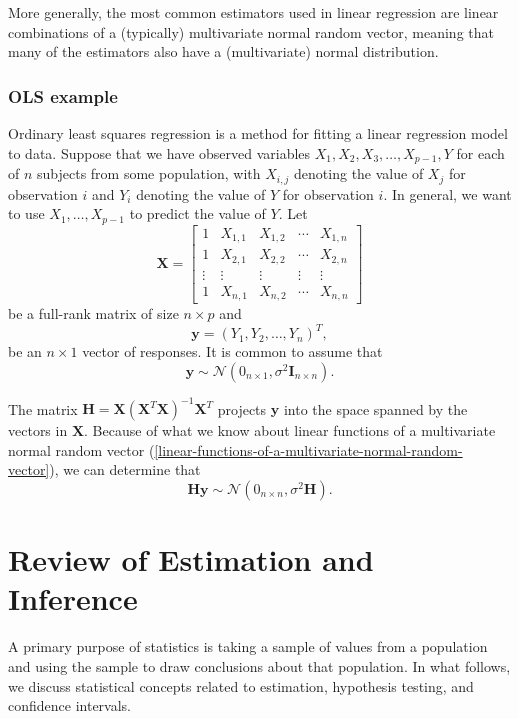 \documentclass[
]{book}
\theoremstyle{definition}
\theoremstyle{definition}
\theoremstyle{definition}
\theoremstyle{definition}
\theoremstyle{remark}
\begin{document}
More generally, the most common estimators used in linear regression are linear combinations of a (typically) multivariate normal random vector, meaning that many of the estimators also have a (multivariate) normal distribution.

\hypertarget{ols-example}{%
\subsection{OLS example}\label{ols-example}}

Ordinary least squares regression is a method for fitting a linear regression model to data. Suppose that we have observed variables \(X_1, X_2, X_3, \ldots, X_{p-1}, Y\) for each of \(n\) subjects from some population, with \(X_{i,j}\) denoting the value of \(X_j\) for observation \(i\) and \(Y_i\) denoting the value of \(Y\) for observation \(i\). In general, we want to use \(X_1, \ldots, X_{p-1}\) to predict the value of \(Y\). Let
\[
\mathbf{X} =
\begin{bmatrix}
1 & X_{1,1} & X_{1,2} & \cdots & X_{1,n} \\
1 & X_{2,1} & X_{2,2} & \cdots & X_{2,n} \\
\vdots & \vdots & \vdots & \vdots & \vdots \\
1 & X_{n,1} & X_{n,2} & \cdots & X_{n,n}
\end{bmatrix}
\]
be a full-rank matrix of size \(n\times p\) and
\[
\mathbf{y}=(Y_1, Y_2, \ldots,Y_n)^T,
\]
be an \(n\times 1\) vector of responses. It is common to assume that
\[ \mathbf{y}\sim \mathcal{N}(0_{n\times 1}, \sigma^2 \mathbf{I}_{n\times n}).
\]

The matrix \(\mathbf{H}=\mathbf{X}(\mathbf{X}^T\mathbf{X})^{-1}\mathbf{X}^T\) projects \(\mathbf{y}\) into the space spanned by the vectors in \(\mathbf{X}\). Because of what we know about linear functions of a multivariate normal random vector (\ref{linear-functions-of-a-multivariate-normal-random-vector}), we can determine that
\[
\mathbf{Hy}\sim \mathcal{N}(0_{n\times n},\sigma^2 \mathbf{H}).
\]

\hypertarget{est-infer-review}{%
\chapter{Review of Estimation and Inference}\label{est-infer-review}}

A primary purpose of statistics is taking a sample of values from a population and using the sample to draw conclusions about that population. In what follows, we discuss statistical concepts related to estimation, hypothesis testing, and confidence intervals.
\end{document}

